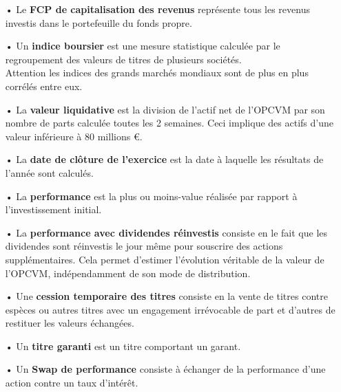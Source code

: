 \documentclass[french,12pt,a4paper]{article}
\begin{document}
\begin{itemize}
\item[•]
Le \textbf{FCP de capitalisation des revenus} représente tous les revenus investis dans le portefeuille du fonds propre.\\

\item[•]
Un \textbf{indice boursier} est une mesure statistique calculée par le regroupement des valeurs de titres de plusieurs sociétés.\\
Attention les indices des grands marchés mondiaux sont de plus en plus corrélés entre eux.\\

\item[•]
La \textbf{valeur liquidative} est la division de l’actif net de l’OPCVM par son nombre de parts calculée toutes les 2 semaines. Ceci implique des actifs d'une valeur inférieure à 80 millions €.\\

\item[•]
La \textbf{date de clôture de l'exercice} est la date à laquelle les résultats de l'année sont calculés.\\

\item[•]
La \textbf{performance} est la plus ou moins-value réalisée par rapport à l’investissement initial.\\

\item[•]
La \textbf{performance avec dividendes réinvestis} consiste en le fait que les dividendes sont réinvestis le jour même pour souscrire des actions supplémentaires. Cela permet d’estimer l’évolution véritable de la valeur de l’OPCVM, indépendamment de son mode de distribution. \\

\item[•]
Une \textbf{cession temporaire des titres} consiste en la vente de titres contre espèces ou autres titres avec un engagement irrévocable de part et d’autres de restituer les valeurs échangées.\\

\item[•]
Un \textbf{titre garanti} est un titre comportant un garant.\\

\item[•]
Un \textbf{Swap de performance} consiste à échanger de la performance d'une action contre un taux d'intérêt.\\


\end{itemize}
\end{document}
